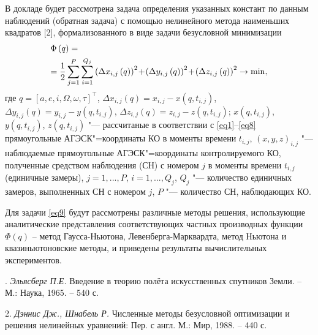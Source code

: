 В докладе будет рассмотрена задача определения указанных констант по данным наблюдений (обратная задача) с помощью нелинейного метода наименьших квадратов [2], формализованного в виде задачи безусловной минимизации
\vskip-7mm
\begin{equation}
\label{eq9}
\begin{gathered}
  \Phi \left( q \right) =  \hfill \\
   = \frac{1}{2}\sum\limits_{j = 1}^P {\sum\limits_{i = 1}^{{Q_j}} {{{\left( {\Delta {x_{i,j}}\left( q \right)} \right)}^2}
\!+\!
{{\left( {\Delta {y_{i,j}}\left( q \right)} \right)}^2}
\!+\!
{{\left( {\Delta {z_{i,j}}\left( q \right)} \right)}^2} \to \min } ,}  \hfill \\
\end{gathered}
\end{equation}
\vskip-5mm
\noindent
где
$q = {\left[ {a,e,i,\Omega ,\omega ,\tau } \right]^{\top}}$,
$\Delta {x_{i,j}}\left( q \right) = {x_{i,j}} \!-\! x\left( {q,{t_{i,j}}} \right)$,
$\Delta {y_{i,j}}\left( q \right) = {y_{i,j}} \!-\! y\left( {q,{t_{i,j}}} \right)$,
$\Delta {z_{i,j}}\left( q \right) = {z_{i,j}} \!-\! z\left( {q,{t_{i,j}}} \right)$;
$x\left( {q,{t_{i,j}}} \right)$,
$y\left( {q,{t_{i,j}}} \right)$,
$z\left( {q,{t_{i,j}}} \right)$ "---
рассчитаные в соответствии с \eqref{eq1}--\eqref{eq8} прямоугольные АГЭСК"=координаты КО в моменты времени
${t_{i,j}}$,
${\left( {x,y,z} \right)_{i,j}}$ "---
наблюдаемые прямоугольные АГЭСК"=координаты контролируемого КО,
полученные средством наблюдения (СН) с номером $j$ в моменты времени
${t_{i,j}}$ (единичные замеры),
$j=1,...,P$,
$i=1,...,Q_j$,
$Q_j$ "--- количество единичных замеров, выполненных СН с номером $j$,
$P$ "--- количество СН, наблюдающих КО.

Для задачи \eqref{eq9} будут рассмотрены различные методы решения, использующие аналитические представления соответствующих частных производных функции
$\Phi \left( q \right)$
 -- метод Гаусса-Ньютона, Левенберга-Марквардта, метод Ньютона и квазиньютоновские методы, и приведены результаты вычислительных экспериментов.

. {\it Эльясберг П.Е.}
 Введение в теорию полёта искусственных спутников Земли. – М.: Наука, 1965. – 540 с.

2. {\it Дэннис Дж., Шнабель Р.} Численные методы безусловной оптимизации и решения нелинейных уравнений: Пер. с англ. М.: Мир, 1988. – 440 с.
